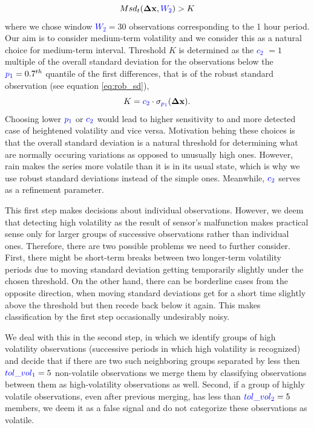 \documentclass[12pt,a4paper]{article}
\begin{document}
$$ Msd_t(\mathbf{\Delta x},\textcolor{blue}{W_2}) > K $$
where we chose window  \textcolor{blue}{$W_2$}$ = 30 $ observations corresponding to the 1 hour period.  Our aim is to consider medium-term volatility and we consider this as a natural choice for medium-term interval. Threshold $K$ is determined as the \textcolor{blue}{$c_2$} $=1$ multiple of the overall standard deviation for the observations below the $\textcolor{blue}{p_1} = 0.7^{th}$ quantile of the first differences, that is of the robust standard observation (see equation \ref{eq:rob_sd}),
$$ K = \textcolor{blue}{c_2} \cdot \sigma_{\textcolor{blue}{p_1}}(\mathbf{\Delta x}).$$
 Choosing lower $\textcolor{blue}{p_1}$ or $\textcolor{blue}{c_2}$ would lead to  higher sensitivity to and more detected case of heightened volatility and vice versa. Motivation behing these choices is that the overall standard deviation is a natural  threshold for determining what are normally occuring variations as opposed to unusually high ones. However, rain makes the series more volatile than it is in its usual state, which is why we use robust standard deviations instead of the simple ones. Meanwhile,  $\textcolor{blue}{c_2}$ serves as a refinement parameter.

This first step makes decisions about individual observations. However, we deem that detecting high volatility as the result of sensor's malfunction makes practical sense only for larger groups of successive observations rather than individual ones. Therefore, there are two possible problems we need to further consider. First, there might be short-term breaks between two longer-term volatility periods due to moving standard deviation getting temporarily slightly under the chosen threshold. On the other hand, there can be borderline cases from the opposite direction, when moving standard deviations get for a short time slightly above the threshold but then recede back below it again. This makes classification by the first step occasionally undesirably noisy.

We deal with this in the second step, in which we  identify groups of high volatility observations (successive periods in which high volatility is recognized) and decide that  if there are two such neighboring groups separated by less then $\textcolor{blue}{tol\_vol_1} = 5$ non-volatile observations we merge them by classifying observations between them as high-volatility observations as well. Second, if a group of highly volatile observations, even after previous merging,  has less than $\textcolor{blue}{tol\_vol_2} = 5$ members, we deem it as a false signal and do not categorize these observations as volatile.
\end{document}
